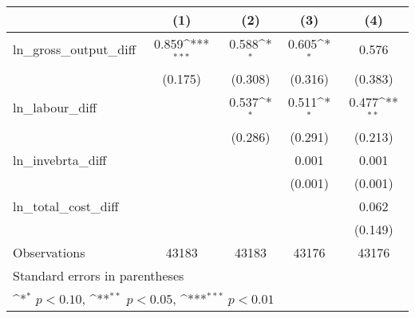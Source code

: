 {
\def\sym#1{\ifmmode^{#1}\else\(^{#1}\)\fi}
\begin{tabular}{l*{4}{c}}
\hline\hline
                &\multicolumn{1}{c}{(1)}         &\multicolumn{1}{c}{(2)}         &\multicolumn{1}{c}{(3)}         &\multicolumn{1}{c}{(4)}         \\
\hline
ln\_gross\_output\_diff&    0.859\sym{***}&    0.588\sym{*}  &    0.605\sym{*}  &    0.576         \\
                &  (0.175)         &  (0.308)         &  (0.316)         &  (0.383)         \\
[1em]
ln\_labour\_diff  &                  &    0.537\sym{*}  &    0.511\sym{*}  &    0.477\sym{**} \\
                &                  &  (0.286)         &  (0.291)         &  (0.213)         \\
[1em]
ln\_invebrta\_diff&                  &                  &    0.001         &    0.001         \\
                &                  &                  &  (0.001)         &  (0.001)         \\
[1em]
ln\_total\_cost\_diff&                  &                  &                  &    0.062         \\
                &                  &                  &                  &  (0.149)         \\
\hline
Observations    &    43183         &    43183         &    43176         &    43176         \\
\hline\hline
\multicolumn{5}{l}{\footnotesize Standard errors in parentheses}\\
\multicolumn{5}{l}{\footnotesize \sym{*} \(p<0.10\), \sym{**} \(p<0.05\), \sym{***} \(p<0.01\)}\\
\end{tabular}
}
